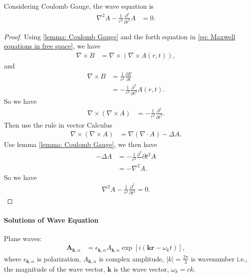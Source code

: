 \documentclass[../../note.tex]{subfiles}
\begin{document}
\begin{lemma}
    \label{lemma: wave equation}
    Considering Coulomb Gauge, the wave equation is
    \begin{align}
        \nabla^2 A - \frac{1}{c^2} \frac{\partial^2}{\partial t^2} A 
        &= 0.
    \end{align}
\end{lemma}
\begin{proof}
    Using \ref{lemma: Coulomb Gauge} and the forth equation in \ref{eq: Maxwell equations in free space}, we have
    \begin{align}
        \nabla \times B 
        &= \nabla \times (\nabla \times A(r,t)),
    \end{align}
    and 
    \begin{align}
        \nabla \times B 
        &= \frac{1}{c^2} \frac{\partial E}{\partial t} \\
        &= - \frac{1}{c^2} \frac{\partial^2}{\partial t^2} A(r,t).
    \end{align}
    So we have
    \begin{align}
        \nabla \times (\nabla \times A)
        &= - \frac{1}{c^2} \frac{\partial^2}{\partial t^2}.
    \end{align}
    Then use the rule in vector Calculus
    \begin{align}
        \nabla \times (\nabla \times A)
        &= \nabla(\nabla \cdot A) - \Delta A.
    \end{align}
    Use lemma \ref{lemma: Coulomb Gauge}, we then have
    \begin{align}
        - \Delta A
        &= -\frac{1}{c^2} \frac{\partial^2}{}\partial t^2 A \\
        &= - \nabla^2 A.
    \end{align}
    So we have
    \begin{align}
        \nabla^2 A - \frac{1}{c^2} \frac{\partial^2}{\partial t^2} = 0.
    \end{align}
\end{proof}

\paragraph{Solutions of Wave Equation}
\begin{lemma}
    Plane waves:
    \begin{align}
        \textbf{A}_{\textbf{k},\alpha}
        &= \epsilon_{\textbf{k}, \alpha} A_{\textbf{k},\alpha} \exp\left[i(\textbf{k}\textbf{r}-\omega_k t)\right],
    \end{align}
    where $\epsilon_{\textbf{k}, \alpha}$ is polarization, $A_{\textbf{k}, \alpha}$ is complex amplitude, $\vert k \vert = \frac{2 \pi}{\lambda}$ is wavenumber i.e., the magnitude of the wave vector, $\textbf{k}$ is the wave vector, $\omega_k = c k$.
\end{lemma}
\end{document}
